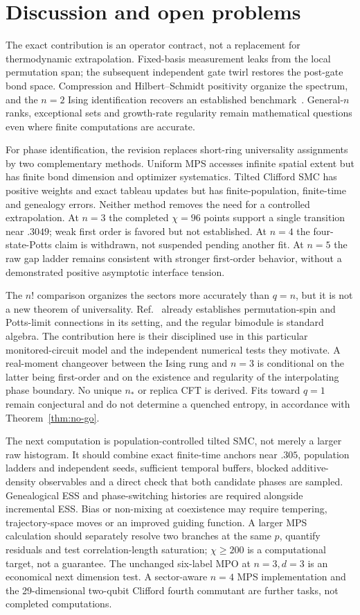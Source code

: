 \section{Discussion and open problems}

The exact contribution is an operator contract, not a replacement for thermodynamic extrapolation. Fixed-basis measurement leaks from the local permutation span; the subsequent independent gate twirl restores the post-gate bond space. Compression and Hilbert--Schmidt positivity organize the spectrum, and the $n=2$ Ising identification recovers an established benchmark~\cite{Bao2020}. General-$n$ ranks, exceptional sets and growth-rate regularity remain mathematical questions even where finite computations are accurate.

For phase identification, the revision replaces short-ring universality assignments by two complementary methods. Uniform MPS accesses infinite spatial extent but has finite bond dimension and optimizer systematics. Tilted Clifford SMC has positive weights and exact tableau updates but has finite-population, finite-time and genealogy errors. Neither method removes the need for a controlled extrapolation. At $n=3$ the completed $\chi=96$ points support a single transition near $.3049$; weak first order is favored but not established. At $n=4$ the four-state-Potts claim is withdrawn, not suspended pending another fit. At $n=5$ the raw gap ladder remains consistent with stronger first-order behavior, without a demonstrated positive asymptotic interface tension.

The $n!$ comparison organizes the sectors more accurately than $q=n$, but it is not a new theorem of universality. Ref.~\cite{Vasseur2019} already establishes permutation-spin and Potts-limit connections in its setting, and the regular bimodule is standard algebra. The contribution here is their disciplined use in this particular monitored-circuit model and the independent numerical tests they motivate. A real-moment changeover between the Ising rung and $n=3$ is conditional on the latter being first-order and on the existence and regularity of the interpolating phase boundary. No unique $n_*$ or replica CFT is derived. Fits toward $q=1$ remain conjectural and do not determine a quenched entropy, in accordance with Theorem~\ref{thm:no-go}.

The next computation is population-controlled tilted SMC, not merely a larger raw histogram. It should combine exact finite-time anchors near $.305$, population ladders and independent seeds, sufficient temporal buffers, blocked additive-density observables and a direct check that both candidate phases are sampled. Genealogical ESS and phase-switching histories are required alongside incremental ESS. Bias or non-mixing at coexistence may require tempering, trajectory-space moves or an improved guiding function. A larger MPS calculation should separately resolve two branches at the same $p$, quantify residuals and test correlation-length saturation; $\chi\ge200$ is a computational target, not a guarantee. The unchanged six-label MPO at $n=3,d=3$ is an economical next dimension test. A sector-aware $n=4$ MPS implementation and the 29-dimensional two-qubit Clifford fourth commutant are further tasks, not completed computations.

